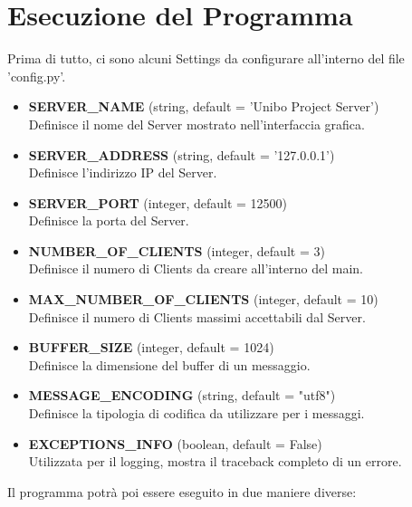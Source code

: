 \documentclass[a4paper,12pt]{report}
\begin{document}
    \chapter*{Esecuzione del Programma}

        Prima di tutto, ci sono alcuni Settings da configurare all'interno del file 'config.py'.
        \begin{itemize}
            \item \textbf{SERVER\_NAME} (string, default = 'Unibo Project Server')\\
                Definisce il nome del Server mostrato nell'interfaccia grafica.
            \item \textbf{SERVER\_ADDRESS} (string, default = '127.0.0.1')\\
                Definisce l'indirizzo IP del Server.
            \item \textbf{SERVER\_PORT} (integer, default = 12500)\\
                Definisce la porta del Server.
            \item \textbf{NUMBER\_OF\_CLIENTS} (integer, default =  3)\\
                Definisce il numero di Clients da creare all'interno del main.
            \item \textbf{MAX\_NUMBER\_OF\_CLIENTS} (integer, default =  10)\\
                Definisce il numero di Clients massimi accettabili dal Server.
            \item \textbf{BUFFER\_SIZE} (integer, default =  1024)\\
                Definisce la dimensione del buffer di un messaggio.
            \item \textbf{MESSAGE\_ENCODING} (string, default =  "utf8")\\
                Definisce la tipologia di codifica da utilizzare per i messaggi.
            \item \textbf{EXCEPTIONS\_INFO} (boolean, default =  False)\\
                Utilizzata per il logging, mostra il traceback completo di un errore.
        \end{itemize}
        \newpage
        Il programma potrà poi essere eseguito in due maniere diverse:
\end{document}
